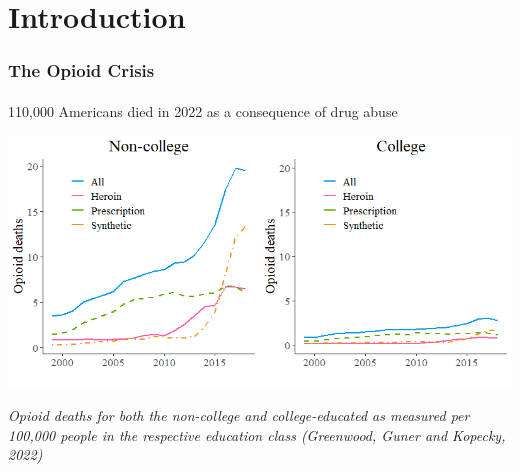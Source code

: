 

\section{Introduction}

\begin{frame}

    \frametitle{The Opioid Crisis} %
    \framesubtitle{}  %
    \rmfamily %

    \begin{wideitemize}
        \item 110,000 Americans died in 2022 as a consequence of drug abuse
    \end{wideitemize}

    \begin{center}
        \includegraphics[scale=0.5]{ODD.png}
    \end{center}

    {\footnotesize \textit{Opioid deaths for both the non-college and college-educated as measured per 100,000 people in the respective education class (\textcolor{fgre}{Greenwood, Guner and Kopecky, 2022})}}
    
\end{frame}


